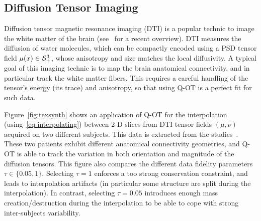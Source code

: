 



\subsection{Diffusion Tensor Imaging}

Diffusion tensor magnetic resonance imaging (DTI) is a popular technic to image the white matter of the brain (see~\cite{wandell2016clarifying} for a recent overview). DTI measures the diffusion of water molecules, which can be compactly encoded using a PSD tensor field $\mu(x) \in \mathcal{S}_+^3$, whose anisotropy and size matches the local diffusivity. 
%
A typical goal of this imaging technic is to map the brain anatomical connectivity, and in particular track the  white matter fibers. This requires a careful handling of the tensor's energy (its trace) and anisotropy, so that using Q-OT is a perfect fit for such data.

Figure~\ref{fig:texsynth} shows an application of Q-OT for the interpolation (using~\ref{eq-interpolating}) between 2-D slices from DTI tensor fields $(\mu,\nu)$ acquired on two different subjects. This data is extracted from the studies~\cite{pestilli2014evaluation,takemura2016ensemble}. These two patients exhibit different anatomical connectivity geometries, and Q-OT is able to track the variation in both orientation and magnitude of the diffusion tensors. This figure also compares the different data fidelity parameters $\tau \in \{0.05,1\}$. Selecting $\tau=1$ enforces a too strong conservation constraint, and leads to interpolation artifacts (in particular some structure are split during the interpolation). In contrast, selecting $\tau=0.05$ introduces enough mass creation/destruction during the interpolation to be able to cope with strong inter-subjects variability.

